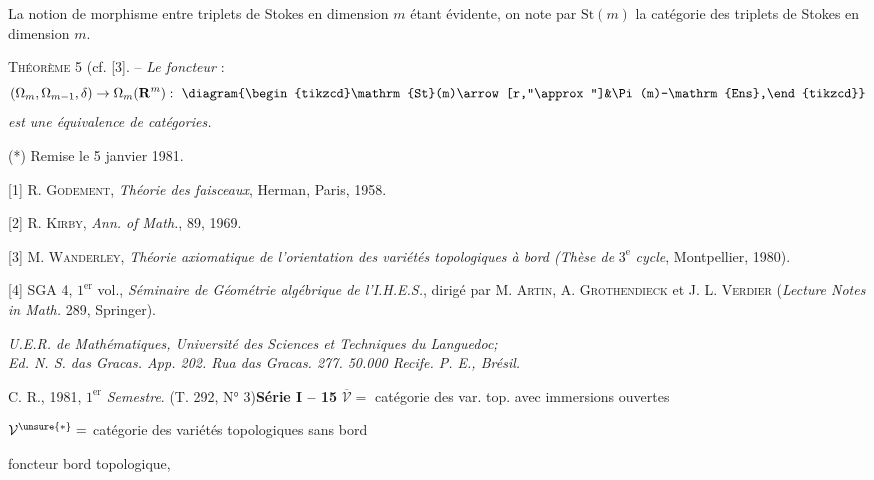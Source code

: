 La notion de morphisme entre triplets de Stokes en dimension $m$ étant évidente, on note par $\mathrm{St}(m)$ la catégorie des triplets de Stokes en dimension $m$.

\textsc{Théorème} 5 (cf. [3]. -- \textit{Le foncteur} :
\[
(\Omega_m,\Omega_{m-1},\delta)\to\Omega_m(\mathbf R^m):\ \diagram{\begin{tikzcd}\mathrm{St}(m)\arrow[r,"\approx"]&\Pi(m)-\mathrm{Ens},\end{tikzcd}}
\]
\textit{est une équivalence de catégories.}

(*) Remise le 5 janvier 1981.

[1] R. \textsc{Godement}, \textit{Théorie des faisceaux}, Herman, Paris, 1958.

[2] R. \textsc{Kirby}, \textit{Ann. of Math.}, 89, 1969.

[3] M. \textsc{Wanderley}, \textit{Théorie axiomatique de l'orientation des variétés topologiques à bord (Thèse de} $3^{\mathrm e}$ \textit{cycle}, Montpellier, 1980).

[4] SGA 4, $1^{\mathrm{er}}$ vol., \textit{Séminaire de Géométrie algébrique de l'I.H.E.S.}, dirigé par M. \textsc{Artin}, A. \textsc{Grothendieck} et J. L. \textsc{Verdier} (\textit{Lecture Notes in Math.} 289, Springer).

\textit{U.E.R. de Mathématiques, Université des Sciences et Techniques du Languedoc;}\\
\textit{Ed. N. S. das Gracas. App. 202. Rua das Gracas. 277. 50.000 Recife. P. E., Brésil.}

C. R., 1981, $1^{\mathrm{er}}$ \textit{Semestre}. (T. 292, N° 3)\hfill\textbf{Série I -- 15}
$\overline{\mathcal V}=$ catégorie des var. top.  avec immersions ouvertes

$\mathcal V^{\unsure{*}}=$ catégorie des variétés topologiques sans bord

 foncteur bord topologique,

